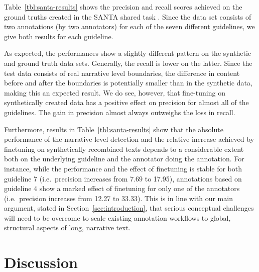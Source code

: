 \documentclass[10pt, a4paper]{article}
\newcommand{\sina}[1]{\textit{\textcolor{blue}{sina: #1}}}
\newcommand{\nils}[1]{\textit{\textcolor{violet}{nils: #1}}}
\begin{document}
Table~\ref{tbl:santa-results} shows the precision and recall scores achieved on the ground truths created in the SANTA shared task \cite{Gius:2021tj}. Since the data set consists of two annotations (by two annotators) for each of the seven different guidelines, we give both results for each guideline.

As expected, the performances show a slightly different pattern on the synthetic and ground truth data sets. Generally, the recall is lower on the latter. 
Since the test data consists of real narrative level boundaries, the difference in content before and after the boundaries is potentially smaller than in the synthetic data, making this an expected result.
We do see, however, that fine-tuning on synthetically created data has a positive effect on precision for almost all of the guidelines. The gain in precision almost always outweighs the loss in recall.

Furthermore, results in Table~\ref{tbl:santa-results} show that the absolute performance of the narrative level detection and the relative increase achieved by finetuning on synthetically recombined texts depends to a considerable extent both on the underlying guideline and the annotator doing the annotation. 
For instance, while the performance and the effect of finetuning is stable for both guideline 7 (i.e.\ precision increases from 7.69 to 17.95), annotations based on guideline 4 show a marked effect of finetuning for only one of the annotators (i.e.\ precision increases from 12.27 to 33.33). This is in line with our main argument, stated in Section~\ref{sec:introduction}, that serious conceptual challenges will need to be overcome to scale existing annotation workflows to global, structural aspects of long, narrative text. 

\section{Discussion}
\label{sec:discussion}



\end{document}
